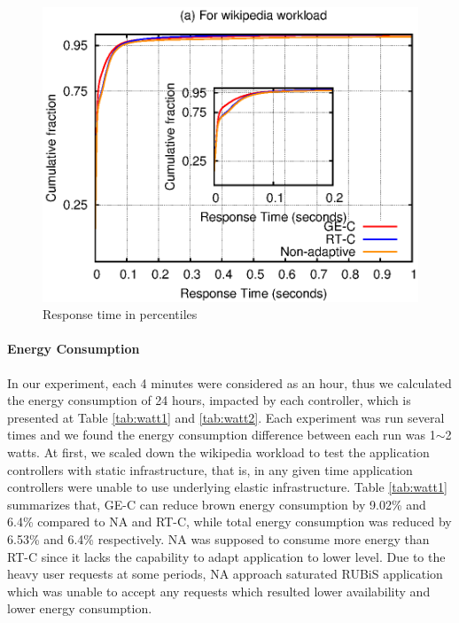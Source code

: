 \begin{figure} [htb]
\centering
\includegraphics[scale=.75]{Graphs/percentile.eps}
\caption{Response time in percentiles}
\label{fig:perc}
\end{figure}






\paragraph*{\textbf{Energy Consumption}}

In our experiment, each 4 minutes were considered as an
hour, thus we calculated the energy consumption of 24
hours, impacted by each controller, which is presented at
Table \ref{tab:watt1} and \ref{tab:watt2}. Each experiment was run several times and we found the energy consumption difference between each run
was 1$\sim$2 watts. At first, we scaled down the wikipedia workload to test the application controllers with static infrastructure, that is, in any given time application controllers were unable to use underlying elastic infrastructure. Table \ref{tab:watt1} summarizes that, GE-C can reduce brown energy consumption by 9.02\% and 6.4\% compared to NA and RT-C, while total energy consumption was reduced by 6.53\% and 6.4\% respectively. NA was supposed to consume more energy than RT-C since it lacks the capability to adapt application to lower level. Due to the heavy  user requests at some periods, NA approach saturated RUBiS application which was unable to accept any requests which resulted lower availability and lower energy consumption.

